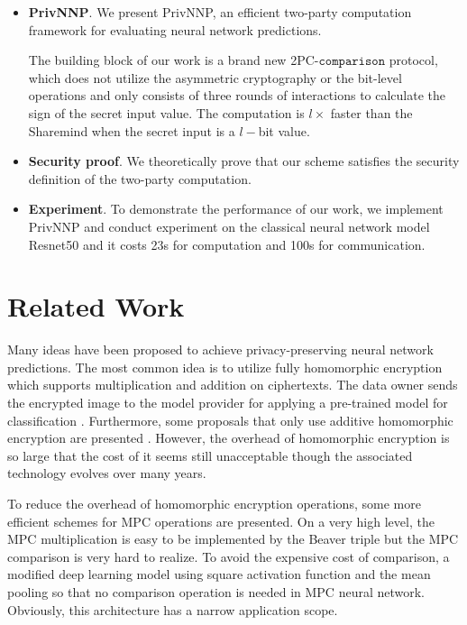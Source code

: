 \documentclass[letterpaper]{article} %
\begin{document}
    \begin{itemize}
        \item \textbf{PrivNNP}.
        We present PrivNNP, an efficient two-party computation framework
        for evaluating neural network predictions.

        The building block of our work is a brand new 2PC-$\mathtt{comparison}$ protocol,
        which does not utilize the asymmetric cryptography or the bit-level operations
        and only consists of three rounds of interactions to calculate the sign of the secret input value.
        The computation is $l\times$ faster than the Sharemind \cite{Sharemind}
        when the secret input is a $l-$bit value.
        \item \textbf{Security proof}.
        We theoretically prove that our scheme satisfies the
        security definition of the two-party computation.

        \item \textbf{Experiment}.
        To demonstrate the performance of our work,
        we implement PrivNNP and conduct experiment on the classical
        neural network model Resnet50 and
        it costs 23s for computation and 100s for communication.

   \end{itemize}

\section{Related Work}
    Many ideas have been proposed to achieve privacy-preserving neural network predictions.
    The most common idea is to utilize fully homomorphic encryption  \cite{SEAL} \cite{Homomorphic1}
    which supports multiplication and addition on ciphertexts.
    The data owner sends the encrypted image to the model provider for applying a pre-trained model for classification \cite{FullyHomomorphic}.
    Furthermore, some proposals that only use additive homomorphic encryption are presented \cite{Homomorphic2}.
    However, the overhead of homomorphic encryption is so large that
    the cost of it seems still unacceptable
    though the associated technology evolves over many years\cite{ObliviousNeuralNetwork}.

    To reduce the overhead of homomorphic encryption operations,
    some more efficient schemes for MPC operations are presented.
    On a very high level, the MPC multiplication is easy to be implemented by the Beaver triple \cite{EfficientMultipartyProtocols}
    but the MPC comparison is very hard to realize.
    To avoid the expensive cost of comparison,
    a modified deep learning model \cite{CryptoNets} using square activation function and the mean pooling so that
    no comparison operation is needed in MPC neural network.
    Obviously, this architecture has a narrow application scope.
\end{document}
